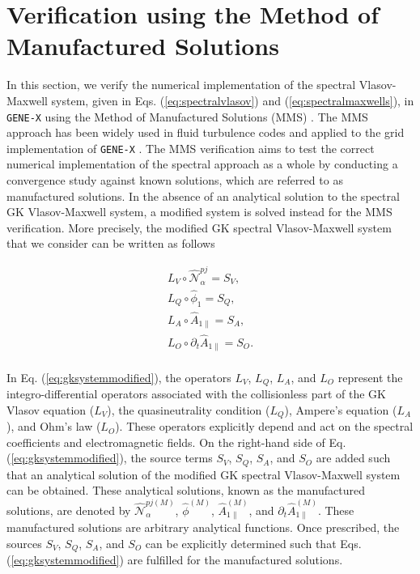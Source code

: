 \documentclass[preprint,12pt]{elsarticle}
\begin{document}
\section{Verification using the Method of Manufactured Solutions}
\label{sec:mms}

In this section, we verify the numerical implementation of the spectral Vlasov-Maxwell system, given in Eqs. (\ref{eq:spectralvlasov}) and (\ref{eq:spectralmaxwells}), in \verb|GENE-X| using the Method of Manufactured Solutions (MMS) \cite{roache2002}. The MMS approach has been widely used in fluid turbulence codes \cite{riva2014,stegmeir2019} and applied to the grid implementation of \verb|GENE-X| \cite{michels2021}. The MMS verification aims to test the correct numerical implementation of the spectral approach as a whole by conducting a convergence study against known solutions, which are referred to as manufactured solutions. In the absence of an analytical solution to the spectral GK Vlasov-Maxwell system, a modified system is solved instead for the MMS verification. More precisely, the modified GK spectral Vlasov-Maxwell system that we consider can be written as follows

\begin{subequations} \label{eq:gksystemmodified}
\begin{align}
L_V \circ  \hat{\mathcal{N}}_\alpha^{pj}   = S_V, \\
L_Q \circ \hat \phi_1 = S_{Q}, \\
L_A \circ \hat A_{1 \parallel } = S_{A}, \\
L_O\circ  \partial_t \hat A_{1 \parallel } = S_{O}.
\end{align}
\end{subequations}
\\
In Eq. (\ref{eq:gksystemmodified}), the operators $L_V$, $L_Q$, $L_A$, and $L_O$ represent the integro-differential operators associated with the collisionless part of the GK Vlasov equation ($L_V$), the quasineutrality condition ($L_Q$), Ampere’s equation ($L_A$), and Ohm’s law ($L_O$). These operators explicitly depend and act on the spectral coefficients and electromagnetic fields. On the right-hand side of Eq. (\ref{eq:gksystemmodified}), the source terms $S_V$, $S_Q$, $S_A$, and $S_O$ are added such that an analytical solution of the modified GK spectral Vlasov-Maxwell system can be obtained. These analytical solutions, known as the manufactured solutions, are denoted by $\hat{\mathcal{N}}_\alpha^{pj (M)}$, $\hat{\phi}^{(M)}$, $\hat{A}_{1 \parallel }^{(M)}$, and $\partial_t \hat{A}_{1 \parallel }^{(M)}$. These manufactured solutions are arbitrary analytical functions. Once prescribed, the sources $S_V$, $S_Q$, $S_A$, and $S_O$ can be explicitly determined such that Eqs. (\ref{eq:gksystemmodified}) are fulfilled for the manufactured solutions. 
\end{document}
